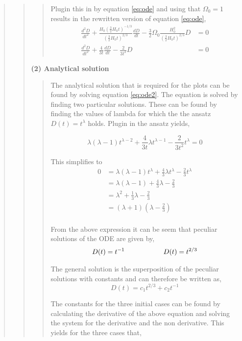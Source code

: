 \begin{quote}
\begin{quote}
\begin{quote}
Plugin this in by equation \ref{eq:ode} and using that $\Omega_0 = 1$  results in the rewritten version of equation \ref{eq:ode},
\begin{align}
\frac{d^2D}{dt^2} + \frac{H_0 \left(\frac{3}{2} H_0 t \right)^{-1/3}}{\left(\frac{3}{2} H_0 t \right)^{2/3}} \frac{dD}{dt} - \frac{3}{2} \Omega_0 \frac{H_0^2}{\left(\frac{3}{2} H_0 t \right)^{2/3}}D &= 0 \\
\frac{d^2D}{dt^2} + \frac{4}{3t} \frac{dD}{dt} - \frac{2}{3t^2}D &= 0
\label{eq:ode2}
\end{align}
\end{quote}


\textbf{(2) Analytical solution}
\begin{quote}
The analytical solution that is required for the plots can be found by solving equation \ref{eq:ode2}. The equation is solved by finding two particular solutions. These can be found by finding the values of lambda for which the the ansatz $D(t) = t^{\lambda}$ holds. Plugin in the ansatz yields,

\begin{equation}
\lambda \left(\lambda -1 \right) t^{\lambda - 2} + \frac{4}{3t} \lambda t^{\lambda -1} - \frac{2}{3t^2}t^{\lambda} = 0
\end{equation}

This simplifies to
\begin{align*}
0 & = \lambda \left( \lambda -1 \right) t^{\lambda} + \frac{4}{3} \lambda t^{\lambda} - \frac{2}{3} t^{\lambda}  \\
&= \lambda ( \lambda -1 ) + \frac{4}{3} \lambda - \frac{2}{3}  \\
&= \lambda^2 + \frac{1}{3} \lambda - \frac{2}{3} \\
&= (\lambda + 1) (\lambda - \frac{2}{3} )  \\
\end{align*}

From the above expression it can be seem that peculiar solutions of the ODE are given by,
\begin{equation}
D(t) = t^{-1} \hspace*{2cm} D(t) = t^{2/3}
\end{equation}

The general solution is the superposition of the peculiar solutions with constants and can therefore be written as,
\begin{equation}
D(t) = c_{1} t^{2/3} + c_2 t^{-1}
\end{equation}

The constants for the three initial cases can be found by calculating the derivative of the above equation and solving the system for the derivative and the non derivative.  This yields for the three cases that, 


\end{quote}
\end{quote}
\end{quote}
